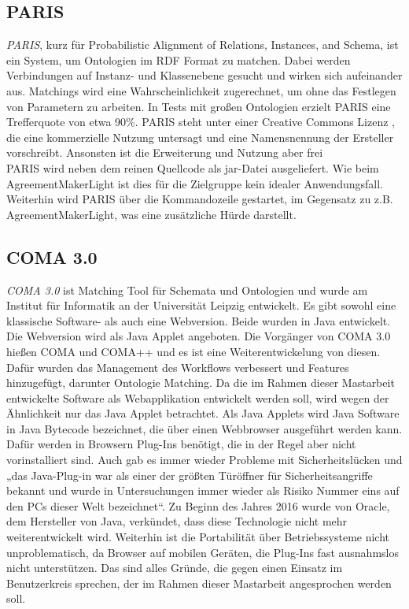 		\subsection{PARIS}
		\textit{PARIS}, kurz für Probabilistic Alignment of Relations, Instances, and
		Schema, ist ein System, um Ontologien im RDF Format zu matchen. Dabei werden Verbindungen
		auf Instanz- und Klassenebene gesucht und wirken sich aufeinander aus. Matchings wird eine Wahrscheinlichkeit zugerechnet, um ohne das Festlegen von Parametern zu arbeiten. In Tests mit großen Ontologien erzielt PARIS eine Trefferquote von etwa 90\%. PARIS steht unter einer Creative Commons Lizenz , die eine kommerzielle Nutzung untersagt und eine Namensnennung der Ersteller vorschreibt. Ansonsten ist die Erweiterung und Nutzung aber frei\\
		PARIS wird neben dem reinen Quellcode als jar-Datei ausgeliefert. Wie beim AgreementMakerLight ist dies für die Zielgruppe kein idealer Anwendungsfall. Weiterhin wird PARIS über die Kommandozeile gestartet, im Gegensatz zu z.B. AgreementMakerLight, was eine zusätzliche Hürde darstellt.
		
		\subsection{COMA 3.0}
		\textit{COMA 3.0} ist Matching Tool für Schemata und Ontologien und wurde am
		Institut für Informatik an der Universität Leipzig entwickelt. Es gibt sowohl eine klassische Software- als auch eine Webversion. Beide wurden in Java entwickelt. Die Webversion wird als Java Applet angeboten. Die Vorgänger von COMA 3.0 hießen COMA und COMA++ und es ist eine Weiterentwickelung von diesen. Dafür wurden das Management des Workflows verbessert und Features hinzugefügt, darunter Ontologie Matching.
		Da die im Rahmen dieser Mastarbeit entwickelte Software als Webapplikation entwickelt werden soll, wird wegen der Ähnlichkeit nur das Java Applet betrachtet. Als Java Applets wird Java Software in Java Bytecode bezeichnet, die über einen Webbrowser ausgeführt werden kann.  Dafür werden in Browsern Plug-Ins benötigt, die in der Regel aber nicht vorinstalliert sind. Auch gab es immer wieder Probleme mit Sicherheitslücken und „das Java-Plug-in war als einer der größten Türöffner für Sicherheitsangriffe bekannt und wurde in Untersuchungen immer wieder als Risiko Nummer eins auf den PCs dieser Welt bezeichnet“.  Zu Beginn des Jahres 2016 wurde von Oracle, dem Hersteller von Java, verkündet, dass diese Technologie nicht mehr weiterentwickelt wird.  Weiterhin ist die Portabilität über Betriebssysteme nicht unproblematisch, da Browser auf mobilen Geräten, die Plug-Ins fast ausnahmslos nicht unterstützen.  Das sind alles Gründe, die gegen einen Einsatz im Benutzerkreis sprechen, der im Rahmen dieser Mastarbeit angesprochen werden soll.
		
